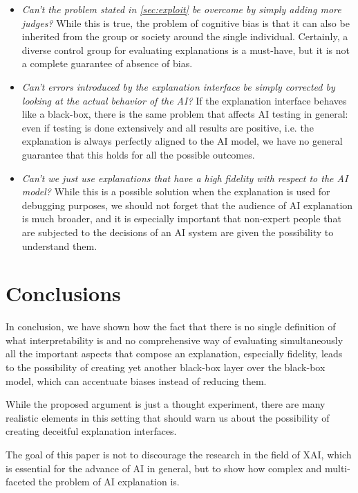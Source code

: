 \documentclass[conference]{IEEEtran}
\begin{document}
\begin{itemize}
    \item \textit{Can't the problem stated in \ref{sec:exploit} be overcome by
              simply adding more judges?} While this is true, the problem of cognitive
          bias is that it can also be inherited from the group or society around the
          single individual. Certainly, a diverse control group for evaluating
          explanations is a must-have, but it is not a complete guarantee of absence
          of bias.
    \item \textit{Can't errors introduced by the explanation interface be simply
              corrected by looking at the actual behavior of the AI?} If the explanation
          interface behaves like a black-box, there is the same problem that affects
          AI testing in general: even if testing is done extensively and all results
          are positive, i.e. the explanation is always perfectly aligned to the AI
          model, we have no general guarantee that this holds for all the possible
          outcomes.
    \item \textit{Can't we just use explanations that have a high fidelity with
              respect to the AI model?} While this is a possible solution when the
          explanation is used for debugging purposes, we should not forget that the
          audience of AI explanation is much broader, and it is especially important
          that non-expert people that are subjected to the decisions of an AI system
          are given the possibility to understand them.
\end{itemize}

\section{Conclusions}
\label{sec:conclusions}

In conclusion, we have shown how the fact that there is no single definition of
what interpretability is and no comprehensive way of evaluating simultaneously
all the important aspects that compose an explanation, especially fidelity,
leads to the possibility of creating yet another black-box layer over the
black-box model, which can accentuate biases instead of reducing them.

While the proposed argument is just a thought experiment, there are many
realistic elements in this setting that should warn us about the possibility of
creating deceitful explanation interfaces.

The goal of this paper is not to discourage the research in the field of XAI,
which is essential for the advance of AI in general, but to show how complex and
multi-faceted the problem of AI explanation is.



\end{document}
